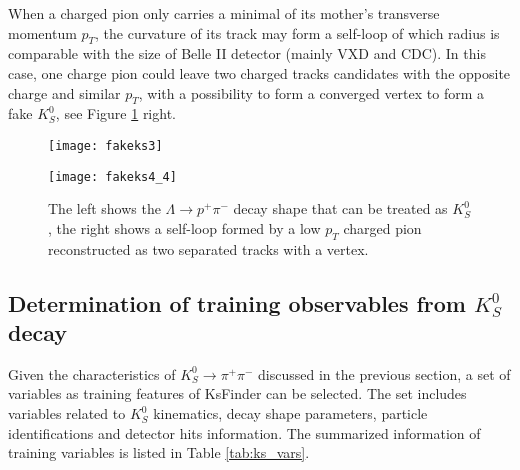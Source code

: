 When a charged pion only carries a minimal of its mother's transverse momentum $p_T$, the curvature of its track may form a self-loop of which radius is comparable with the size of Belle II detector (mainly VXD and CDC). In this case, one charge pion could leave two charged tracks candidates with the opposite charge and similar $p_T$, with a possibility to form a converged vertex to form a fake $K_S^0$, see Figure \ref{fig:fakeks2} right.

\begin{figure}[htbp]
	\begin{minipage}[t]{0.5\linewidth} %
		\centering 
		\texttt{[image: fakeks3]} 
		\label{fig:side:a} 
	\end{minipage}%
	\begin{minipage}[t]{0.5\linewidth} 
		\centering 
		\texttt{[image: fakeks4\_4]} 
		\label{fig:side:b} 
	\end{minipage}%
	
	\caption{The left shows the $\Lambda \to p^+ \pi^-$ decay shape that can be treated as $K_S^0$, the right shows a self-loop formed by a low $p_T$ charged pion reconstructed as two separated tracks with a vertex.}
	\label{fig:fakeks2}
\end{figure}

\subsection{Determination of training observables from $K_S^0$ decay }
Given the characteristics of  $K_S^0 \to \pi^+ \pi^-$ discussed in the previous section, a set of variables as training features of KsFinder can be selected. The set includes variables related to $K_S^0$ kinematics, decay shape parameters, particle identifications and detector hits information. The summarized information of training variables is listed in Table \ref{tab:ks_vars}.

